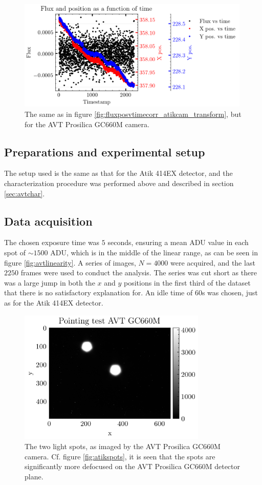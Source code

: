 \documentclass[../main.tex]{subfiles}
\begin{document}
\begin{figure}[h!]
	\centering
	\includegraphics[width = 0.99\textwidth]{fluxposvtimecorr_AVT.png}
	\caption{The same as in figure \ref{fig:fluxposvtimecorr_atikcam_transform}, but for the AVT Prosilica GC660M camera. }
	\label{fig:fluxposvtimecorr_AVT_transform}
\end{figure}

\subsection{Preparations and experimental setup}
The setup used is the same as that for the Atik 414EX detector, and the characterization procedure was performed above and described in section \ref{sec:avtchar}. 

\subsection{Data acquisition}
The chosen exposure time was $5$ seconds, ensuring a mean ADU value in each spot of $\sim 1500$ ADU, which is in the middle of the linear range, as can be seen in figure \ref{fig:avtlinearity}. A series of images, $N=4000$ were acquired, and the last $2250$ frames were used to conduct the analysis. The series was cut short as there was a large jump in both the $x$ and $y$ positions in the first third of the dataset that there is no satisfactory explanation for. An idle time of $60$s was chosen, just as for the Atik 414EX detector.

\begin{figure}
	\centering
	\includegraphics[width	=0.8\textwidth]{pointingtest.png}
	\caption{The two light spots, as imaged by the AVT Prosilica GC660M camera. Cf. figure \ref{fig:atikspots}, it is seen that the spots are significantly more defocused on the AVT Prosilica GC660M detector plane.}
	\label{fig:apertureAVT}
\end{figure}
\end{document}
